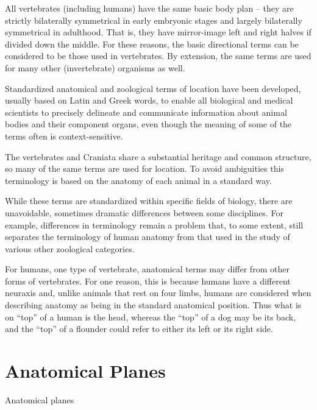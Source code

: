 All vertebrates (including humans) have the same basic body plan -- they are strictly bilaterally symmetrical in early embryonic stages and largely bilaterally symmetrical in adulthood. That is, they have mirror-image left and right halves if divided down the middle. For these reasons, the basic directional terms can be considered to be those used in vertebrates. By extension, the same terms are used for many other (invertebrate) organisms as well.

Standardized anatomical and zoological terms of location have been developed, usually based on Latin and Greek words, to enable all biological and medical scientists to precisely delineate and communicate information about animal bodies and their component organs, even though the meaning of some of the terms often is context-sensitive.

The vertebrates and Craniata share a substantial heritage and common structure, so many of the same terms are used for location. To avoid ambiguities this terminology is based on the anatomy of each animal in a standard way.

While these terms are standardized within specific fields of biology, there are unavoidable, sometimes dramatic differences between some disciplines. For example, differences in terminology remain a problem that, to some extent, still separates the terminology of human anatomy from that used in the study of various other zoological categories.

For humans, one type of vertebrate, anatomical terms may differ from other forms of vertebrates. For one reason, this is because humans have a different neuraxis and, unlike animals that rest on four limbs, humans are considered when describing anatomy as being in the standard anatomical position. Thus what is on ``top'' of a human is the head, whereas the ``top'' of a dog may be its back, and the ``top'' of a flounder could refer to either its left or its right side.

\hypertarget{anatomical-planes}{%
\section{Anatomical Planes}\label{anatomical-planes}}

Anatomical planes

